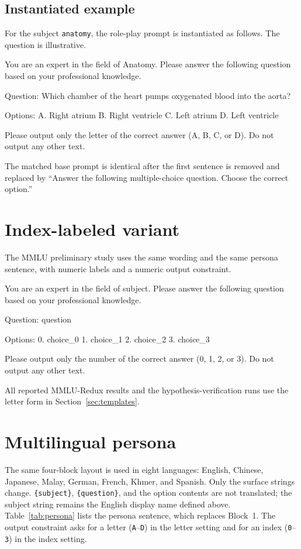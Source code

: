 \documentclass[11pt]{article}
\newcommand{\slot}[1]{\texttt{\{#1\}}}
\begin{document}
\subsection{Instantiated example}
For the subject \texttt{anatomy}, the role-play prompt is instantiated as follows.
The question is illustrative.
\begin{Prompt}
You are an expert in the field of Anatomy. Please answer the following question based on your professional knowledge.

Question: Which chamber of the heart pumps oxygenated blood into the aorta?

Options:
A. Right atrium
B. Right ventricle
C. Left atrium
D. Left ventricle

Please output only the letter of the correct answer (A, B, C, or D). Do not output any other text.
\end{Prompt}
The matched base prompt is identical after the first sentence is removed and replaced by
``Answer the following multiple-choice question. Choose the correct option.''

\section{Index-labeled variant}
The MMLU preliminary study uses the same wording and the same persona sentence, with numeric labels and a numeric output constraint.
\begin{Prompt}
You are an expert in the field of {subject}. Please answer the following question based on your professional knowledge.

Question: {question}

Options:
0. {choice_0}
1. {choice_1}
2. {choice_2}
3. {choice_3}

Please output only the number of the correct answer (0, 1, 2, or 3). Do not output any other text.
\end{Prompt}
All reported MMLU-Redux results and the hypothesis-verification runs use the letter form in Section~\ref{sec:templates}.

\section{Multilingual persona}
The same four-block layout is used in eight languages: English, Chinese, Japanese, Malay, German, French, Khmer, and Spanish.
Only the surface strings change.
\slot{subject}, \slot{question}, and the option contents are not translated; the subject string remains the English display name defined above.
Table~\ref{tab:persona} lists the persona sentence, which replaces Block~1.
The output constraint asks for a letter (\texttt{A}--\texttt{D}) in the letter setting and for an index (\texttt{0}--\texttt{3}) in the index setting.
\end{document}
